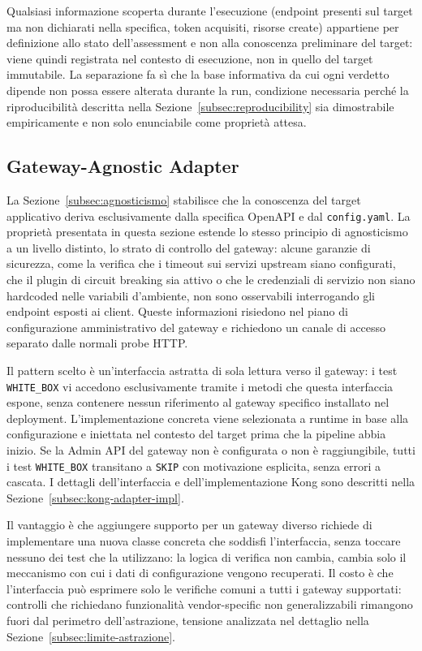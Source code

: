 Qualsiasi informazione scoperta durante l'esecuzione (endpoint presenti sul target ma non dichiarati nella specifica, token acquisiti, risorse create) appartiene per definizione allo stato dell'assessment e non alla conoscenza preliminare del target: viene quindi registrata nel contesto di esecuzione, non in quello del target immutabile. La separazione fa sì che la base informativa da cui ogni verdetto dipende non possa essere alterata durante la run, condizione necessaria perché la riproducibilità descritta nella Sezione~\ref{subsec:reproducibility} sia dimostrabile empiricamente e non solo enunciabile come proprietà attesa.


\subsection{Gateway-Agnostic Adapter}\label{subsec:gateway-adapter}

La Sezione~\ref{subsec:agnosticismo} stabilisce che la conoscenza del target applicativo deriva esclusivamente dalla specifica OpenAPI e dal \texttt{config.yaml}. La proprietà presentata in questa sezione estende lo stesso principio di agnosticismo a un livello distinto, lo strato di controllo del gateway: alcune garanzie di sicurezza, come la verifica che i timeout sui servizi upstream siano configurati, che il plugin di circuit breaking sia attivo o che le credenziali di servizio non siano hardcoded nelle variabili d'ambiente, non sono osservabili interrogando gli endpoint esposti ai client. Queste informazioni risiedono nel piano di configurazione amministrativo del gateway e richiedono un canale di accesso separato dalle normali probe \gls{HTTP}.

Il pattern scelto è un'interfaccia astratta di sola lettura verso il gateway: i test \texttt{WHITE\_BOX} vi accedono esclusivamente tramite i metodi che questa interfaccia espone, senza contenere nessun riferimento al gateway specifico installato nel deployment. L'implementazione concreta viene selezionata a runtime in base alla configurazione e iniettata nel contesto del target prima che la pipeline abbia inizio. Se la Admin \gls{API} del gateway non è configurata o non è raggiungibile, tutti i test \texttt{WHITE\_BOX} transitano a \texttt{SKIP} con motivazione esplicita, senza errori a cascata. I dettagli dell'interfaccia e dell'implementazione Kong sono descritti nella Sezione~\ref{subsec:kong-adapter-impl}.

Il vantaggio è che aggiungere supporto per un gateway diverso richiede di implementare una nuova classe concreta che soddisfi l'interfaccia, senza toccare nessuno dei test che la utilizzano: la logica di verifica non cambia, cambia solo il meccanismo con cui i dati di configurazione vengono recuperati. Il costo è che l'interfaccia può esprimere solo le verifiche comuni a tutti i gateway supportati: controlli che richiedano funzionalità vendor-specific non generalizzabili rimangono fuori dal perimetro dell'astrazione, tensione analizzata nel dettaglio nella Sezione~\ref{subsec:limite-astrazione}.


